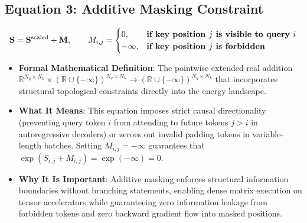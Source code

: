 \documentclass[11pt,a4paper]{article}
\theoremstyle{definition}
\begin{document}
\subsection{\textbf{Equation 3: Additive Masking Constraint}}
{\boldmath
\begin{equation}
\mathbf{S} = \mathbf{S}^{\text{scaled}} + \mathbf{M}, \qquad M_{i, j} = \begin{cases} 0, & \text{\textbf{if key position }} j \text{\textbf{ is visible to query }} i \\ -\infty, & \text{\textbf{if key position }} j \text{\textbf{ is forbidden}} \end{cases}
\end{equation}
}
\begin{itemize}
    \item \textbf{Formal Mathematical Definition}:
    The pointwise extended-real addition $\mathbb{R}^{N_q \times N_k} \times (\mathbb{R} \cup \{-\infty\})^{N_q \times N_k} \to (\mathbb{R} \cup \{-\infty\})^{N_q \times N_k}$ that incorporates structural topological constraints directly into the energy landscape.
    \item \textbf{What It Means}:
    This equation imposes strict causal directionality (preventing query token $i$ from attending to future tokens $j > i$ in autoregressive decoders) or zeroes out invalid padding tokens in variable-length batches. Setting $M_{i, j} = -\infty$ guarantees that $\exp(S_{i, j} + M_{i, j}) = \exp(-\infty) = 0$.
    \item \textbf{Why It Is Important}:
    Additive masking enforces structural information boundaries without branching statements, enabling dense matrix execution on tensor accelerators while guaranteeing zero information leakage from forbidden tokens and zero backward gradient flow into masked positions.
\end{itemize}
\end{document}
